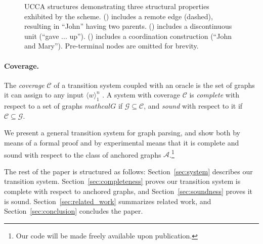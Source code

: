 \documentclass[11pt,a4paper]{article}
\newcommand{\secref}[1]{Section~\ref{#1}}
\begin{document}
\begin{figure}[t]
\begin{subfigure}{.9\columnwidth}
  \parbox{.65\columnwidth}{
  }
  \end{subfigure}
  \caption{\label{fig:examples}
    UCCA structures demonstrating three structural properties exhibited by
    the scheme.
    () includes a remote edge (dashed),
    resulting in ``John'' having two parents.
    () includes a discontinuous unit (``gave ... up'').
    () includes a coordination construction (``John and Mary'').
    Pre-terminal nodes are omitted for brevity.
  }
\end{figure}

\paragraph{Coverage.}
The \textit{coverage} $\mathcal{C}$ of a transition system coupled with an oracle is the set of graphs
it can assign to any input $\langle w\rangle_1^n$ \cite{kuhlmann2010transition}.
A system with coverage $\mathcal{C}$ is \textit{complete} with respect to a set of graphs $mathcal{G}$
if $\mathcal{G}\subseteq\mathcal{C}$, and \textit{sound} with respect to it if
$\mathcal{C}\subseteq\mathcal{G}$.

We present a general transition system for graph parsing,
and show both by means of a formal proof and by experimental means that
it is complete and sound with respect to the class of anchored graphs $\mathcal{A}$.\footnote{Our
code will be made freely available upon publication.}

The rest of the paper is structured as follows:
\secref{sec:system} describes our transition system.
\secref{sec:completeness} proves our transition system is complete with respect to anchored graphs, and
\secref{sec:soundness} proves it is sound.
\secref{sec:related_work} summarizes related work, and
\secref{sec:conclusion} concludes the paper.
\end{document}
